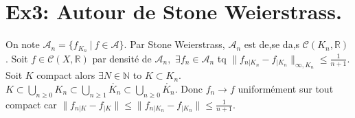 \documentclass[a4paper]{article}
\begin{document}
\section*{Ex3: Autour de Stone Weierstrass.}
On note $\mathcal{A}_n=\{f_{K_n}\ |\ f\in \mathcal{A}\} $. Par Stone Weierstrass, $\mathcal{A}_n$ est de,se da,s $\mathcal{C}(K_n,\mathbb{R})$ . Soit $f\in \mathcal{C}(X,\mathbb{R} )$ par densité de $\mathcal{A}_n,$ $\exists f_n\in \mathcal{A}_n $ tq $\|f_{n|K_n}-f_{|K_n}\|_{\infty ,K_n}\le \frac{1}{n+1}$. Soit $K$ compact alors $\exists N\in \mathbb{N}  $ to $K\subset K_n.$ $K\subset \bigcup\limits_{n\ge 0} K_n\subset \bigcup\limits_{n\ge 1} \mathring{K_{n}}\subset \bigcup\limits_{n\ge 0} \mathring{K_n}$. Donc $f_n\to f$ uniformément sur tout compact car $\|f_{n|K}-f_{|K}\|\le \|f_{n|K_n}-f_{|K_n}\|\le \frac{1}{n+1}$.
\end{document}
